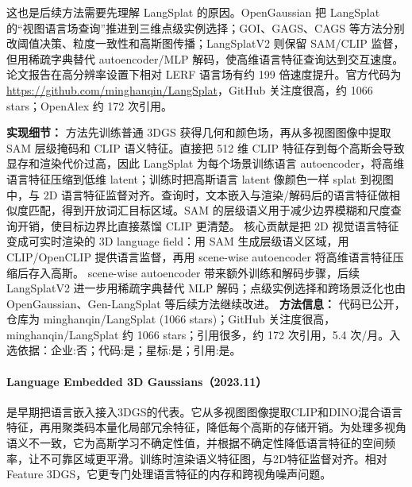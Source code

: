 这也是后续方法需要先理解 LangSplat 的原因。OpenGaussian 把 LangSplat 的“视图语言场查询”推进到三维点级实例选择；GOI、GAGS、CAGS 等方法分别改阈值决策、粒度一致性和高斯图传播；LangSplatV2 则保留 SAM/CLIP 监督，但用稀疏字典替代 autoencoder/MLP 解码，使高维语言特征查询达到交互速度。论文报告在高分辨率设置下相对 LERF 语言场有约 199 倍速度提升。官方代码为 \url{https://github.com/minghanqin/LangSplat}，GitHub 关注度很高，约 1066 stars；OpenAlex 约 172 次引用。

\textbf{实现细节：} 方法先训练普通 3DGS 获得几何和颜色场，再从多视图图像中提取 SAM 层级掩码和 CLIP 语义特征。直接把 512 维 CLIP 特征存到每个高斯会导致显存和渲染代价过高，因此 LangSplat 为每个场景训练语言 autoencoder，将高维语言特征压缩到低维 latent；训练时把高斯语言 latent 像颜色一样 splat 到视图中，与 2D 语言特征监督对齐。查询时，文本嵌入与渲染/解码后的语言特征做相似度匹配，得到开放词汇目标区域。SAM 的层级语义用于减少边界模糊和尺度查询开销，使目标边界比直接蒸馏 CLIP 更清楚。 核心贡献是把 2D 视觉语言特征变成可实时渲染的 3D language field：用 SAM 生成层级语义区域，用 CLIP/OpenCLIP 提供语言监督，再用 scene-wise autoencoder 将高维语言特征压缩后存入高斯。 scene-wise autoencoder 带来额外训练和解码步骤，后续 LangSplatV2 进一步用稀疏字典替代 MLP 解码；点级实例选择和跨场景泛化也由 OpenGaussian、Gen-LangSplat 等后续方法继续改进。
\textbf{方法信息：} 代码已公开，仓库为 minghanqin/LangSplat (1066 stars)；GitHub 关注度很高，minghanqin/LangSplat 约 1066 stars；引用很多，约 172 次引用，5.4 次/月。入选依据：企业:否；代码:是；星标:是；引用:是。


\paragraph{Language Embedded 3D Gaussians（2023.11）\cite{2311_18482}}
是早期把语言嵌入接入3DGS的代表。它从多视图图像提取CLIP和DINO混合语言特征，再用聚类码本量化局部冗余特征，降低每个高斯的存储开销。为处理多视角语义不一致，它为高斯学习不确定性值，并根据不确定性降低语言特征的空间频率，让不可靠区域更平滑。训练时渲染语义特征图，与2D特征监督对齐。相对Feature 3DGS，它更专门处理语言特征的内存和跨视角噪声问题。

